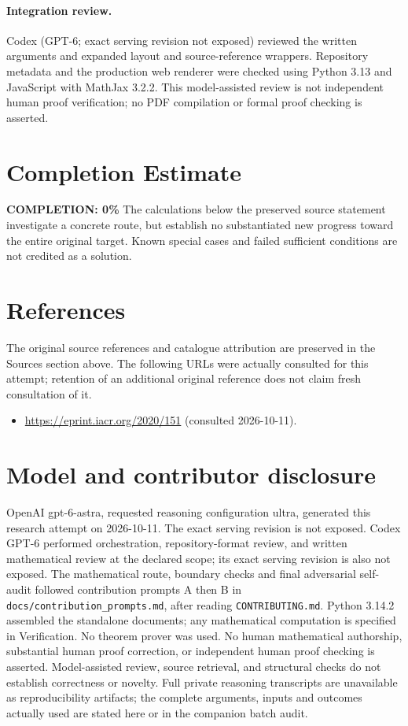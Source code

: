 \documentclass[11pt]{article}
\begin{document}
\paragraph{Integration review.} Codex (GPT-6; exact serving revision not exposed) reviewed the written arguments and expanded layout and source-reference wrappers. Repository metadata and the production web renderer were checked using Python 3.13 and JavaScript with MathJax 3.2.2. This model-assisted review is not independent human proof verification; no PDF compilation or formal proof checking is asserted.

\section{Completion Estimate}
\noindent\textbf{COMPLETION: 0\%}
The calculations below the preserved source statement investigate a concrete route,
but establish no substantiated new progress toward the entire original target.
Known special cases and failed sufficient conditions are not credited as a solution.
\section{References}
The original source references and catalogue attribution are preserved in the
Sources section above. The following URLs were actually consulted for this attempt;
retention of an additional original reference does not claim fresh consultation of it.
\begin{itemize}
\item \url{https://eprint.iacr.org/2020/151} (consulted 2026-10-11). 
\end{itemize}
\section{Model and contributor disclosure}
OpenAI gpt-6-astra, requested reasoning configuration ultra, generated this research
attempt on 2026-10-11. The exact serving revision is not exposed. Codex GPT-6
performed orchestration, repository-format review, and written mathematical review at the declared scope; its exact serving revision
is also not exposed. The mathematical route, boundary checks and final adversarial
self-audit followed contribution prompts A then B in
\texttt{docs/contribution\_prompts.md}, after reading \texttt{CONTRIBUTING.md}.
Python 3.14.2 assembled the standalone documents; any mathematical computation is
specified in Verification. No theorem prover was used. No human mathematical
authorship, substantial human proof correction, or independent human proof checking
is asserted. Model-assisted review, source retrieval, and structural checks do not
establish correctness or novelty. Full private reasoning transcripts are unavailable
as reproducibility artifacts; the complete arguments, inputs and outcomes actually
used are stated here or in the companion batch audit.
\end{document}
